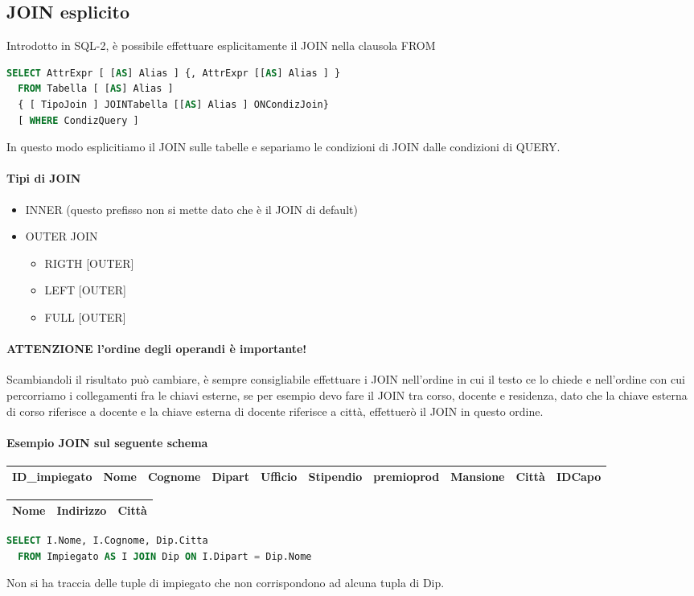 \subsection{JOIN esplicito}
Introdotto in SQL-2, è possibile effettuare esplicitamente il JOIN
nella clausola FROM
\begin{lstlisting}[language=SQL]
  SELECT AttrExpr [ [AS] Alias ] {, AttrExpr [[AS] Alias ] }
  FROM Tabella [ [AS] Alias ]
  { [ TipoJoin ] JOINTabella [[AS] Alias ] ONCondizJoin}
  [ WHERE CondizQuery ]
\end{lstlisting}
In questo modo esplicitiamo il JOIN sulle tabelle e separiamo
le condizioni di JOIN dalle condizioni di QUERY.
\paragraph*{Tipi di JOIN}
\begin{itemize}
  \item INNER (questo prefisso non si mette dato che è il JOIN di default)
  \item OUTER JOIN
  \begin{itemize}
    \item RIGTH [OUTER]
    \item LEFT [OUTER]
    \item FULL [OUTER]
  \end{itemize}
\end{itemize}
\paragraph*{ATTENZIONE l'ordine degli operandi è importante!} Scambiandoli il risultato può cambiare, è sempre
consigliabile effettuare i JOIN nell'ordine in cui il testo ce lo chiede e nell'ordine con cui percorriamo
i collegamenti fra le chiavi esterne, se per esempio devo fare il JOIN tra corso, docente e residenza, dato che la chiave
esterna di corso riferisce a docente e la chiave esterna di docente riferisce a città, effettuerò il JOIN in questo ordine.
\paragraph*{Esempio JOIN sul seguente schema}
\begin{center}
  \begin{tabular}{|c|c|c|c|c|c|c|c|c|c|}
    \hline
    ID\_impiegato & Nome & Cognome & Dipart & Ufficio & Stipendio & premioprod & Mansione & Città & IDCapo \\
    \hline
  \end{tabular}
\end{center}
\begin{tabular}{|c|c|c|}
  \hline
  Nome & Indirizzo & Città\\
  \hline
\end{tabular}
\begin{lstlisting}[language=SQL]
  SELECT I.Nome, I.Cognome, Dip.Citta
  FROM Impiegato AS I JOIN Dip ON I.Dipart = Dip.Nome
\end{lstlisting}
Non si ha traccia delle tuple di impiegato che non corrispondono
ad alcuna tupla di Dip.
